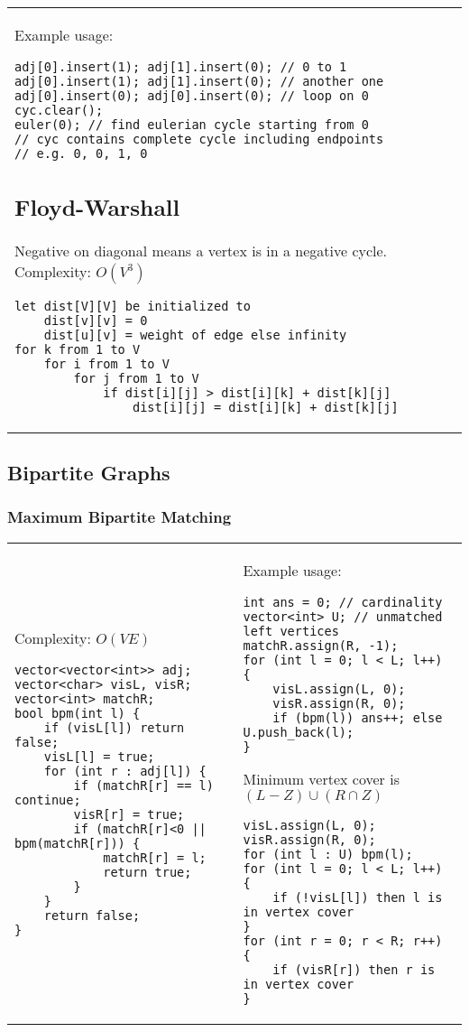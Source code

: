 \documentclass[letterpaper]{article}
\begin{document}
\begin{tabular}{@{}p{9cm}p{9cm}@{}}
    Example usage:
    \begin{lstlisting}
adj[0].insert(1); adj[1].insert(0); // 0 to 1
adj[0].insert(1); adj[1].insert(0); // another one
adj[0].insert(0); adj[0].insert(0); // loop on 0
cyc.clear();
euler(0); // find eulerian cycle starting from 0
// cyc contains complete cycle including endpoints
// e.g. 0, 0, 1, 0
\end{lstlisting}
    \subsection{Floyd-Warshall}

    Negative on diagonal means a vertex is in a negative cycle. Complexity: $O\left(V^3\right)$

    \begin{lstlisting}
let dist[V][V] be initialized to
	dist[v][v] = 0
	dist[u][v] = weight of edge else infinity
for k from 1 to V
	for i from 1 to V
		for j from 1 to V
			if dist[i][j] > dist[i][k] + dist[k][j]
				dist[i][j] = dist[i][k] + dist[k][j]
\end{lstlisting}
\end{tabular}

\clearpage
\subsection{Bipartite Graphs}
\subsubsection{Maximum Bipartite Matching}
\begin{tabular}{@{}p{9cm}p{9cm}@{}}
    Complexity: $O\left(VE\right)$
    \begin{lstlisting}
vector<vector<int>> adj;
vector<char> visL, visR;
vector<int> matchR;
bool bpm(int l) {
	if (visL[l]) return false;
	visL[l] = true;
	for (int r : adj[l]) {
		if (matchR[r] == l) continue;
		visR[r] = true;
		if (matchR[r]<0 || bpm(matchR[r])) {
			matchR[r] = l;
			return true;
		}
	}
	return false;
}
\end{lstlisting}
     &
    Example usage:
    \begin{lstlisting}
int ans = 0; // cardinality
vector<int> U; // unmatched left vertices
matchR.assign(R, -1);
for (int l = 0; l < L; l++) {
	visL.assign(L, 0);
	visR.assign(R, 0);
	if (bpm(l)) ans++; else U.push_back(l);
}
\end{lstlisting}

    Minimum vertex cover is $\left(L-Z\right) \cup \left(R \cap Z\right)$
    \begin{lstlisting}
visL.assign(L, 0);
visR.assign(R, 0);
for (int l : U) bpm(l);
for (int l = 0; l < L; l++) {
	if (!visL[l]) then l is in vertex cover
}
for (int r = 0; r < R; r++) {
	if (visR[r]) then r is in vertex cover
}
\end{lstlisting}
\end{tabular}
\end{document}
